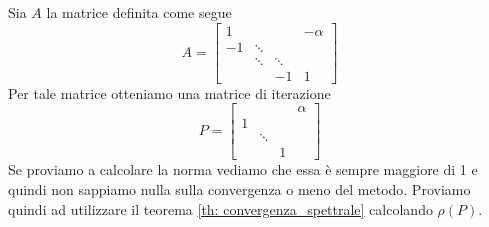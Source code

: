 \begin{example}
	Sia $A$ la matrice definita come segue
	\[
		A = \begin{bmatrix}
			1  &        &        & -\alpha \\
			-1 & \ddots &        &         \\
			   & \ddots & \ddots &         \\
			   &        & -1     & 1
		\end{bmatrix}
	\]
	Per tale matrice otteniamo una matrice di iterazione
	\[
		P = \begin{bmatrix}
			  &        &   & \alpha \\
			1 &        &   &        \\
			  & \ddots &   &        \\
			  &        & 1 &
		\end{bmatrix}
	\]
	Se proviamo a calcolare la norma vediamo che essa è sempre maggiore di 1 e quindi non sappiamo nulla sulla
	convergenza o meno del metodo. Proviamo quindi ad utilizzare il teorema \ref{th: convergenza_spettrale}
	calcolando $\rho (P)$.


\end{example}
